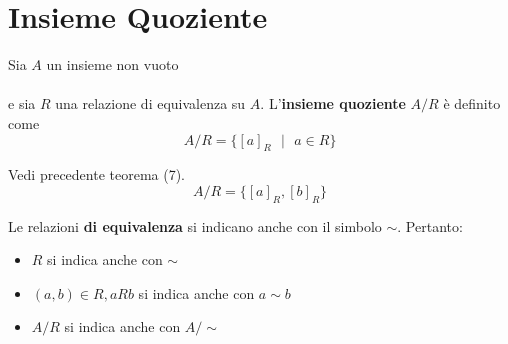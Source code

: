\documentclass[a4paper,12pt, oneside]{book}
\begin{document}
\section{Insieme Quoziente}
\begin{definizione}
	Sia $A$ un insieme non vuoto\\\\
	e sia $R$ una relazione di equivalenza su $A$.
	L'\textbf{insieme quoziente} $A/R$ è definito come
	$$A/R = \{[a]_{R} \mbox{ }|\mbox{ } a \in R\}$$
\end{definizione}
\begin{shaded}
	\begin{esempio}
		Vedi precedente teorema (7).
		$$A/R = \{[a]_{R},[b]_{R}\}$$
	\end{esempio}
\end{shaded}
\begin{osservazione}
	Le relazioni \textbf{di equivalenza} si indicano anche con il simbolo $\sim$. Pertanto:
	\begin{itemize}
		\item $R$ si indica anche con $\sim$
		\item $(a,b) \in R, aRb$ si indica anche con $a \sim b$
		\item $A/R$ si indica anche con $A/\sim$
	\end{itemize}
\end{osservazione}
\end{document}
